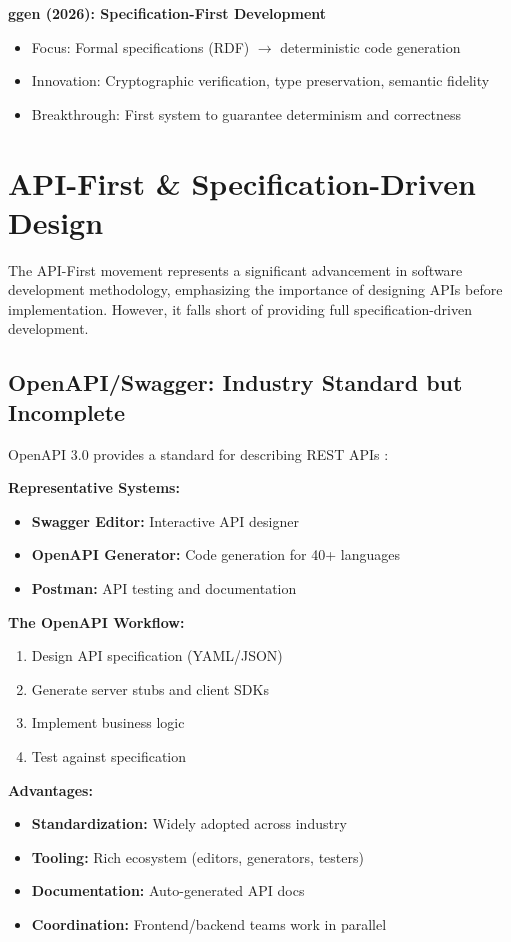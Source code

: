 \textbf{ggen (2026): Specification-First Development}
\begin{itemize}
    \item Focus: Formal specifications (RDF) $\rightarrow$ deterministic code generation
    \item Innovation: Cryptographic verification, type preservation, semantic fidelity
    \item Breakthrough: First system to guarantee determinism and correctness
\end{itemize}

\section{API-First \& Specification-Driven Design}

The API-First movement represents a significant advancement in software development methodology, emphasizing the importance of designing APIs before implementation. However, it falls short of providing full specification-driven development.

\subsection{OpenAPI/Swagger: Industry Standard but Incomplete}

OpenAPI 3.0 provides a standard for describing REST APIs \cite{openapi2020}:

\textbf{Representative Systems:}
\begin{itemize}
    \item \textbf{Swagger Editor:} Interactive API designer
    \item \textbf{OpenAPI Generator:} Code generation for 40+ languages
    \item \textbf{Postman:} API testing and documentation
\end{itemize}

\textbf{The OpenAPI Workflow:}
\begin{enumerate}
    \item Design API specification (YAML/JSON)
    \item Generate server stubs and client SDKs
    \item Implement business logic
    \item Test against specification
\end{enumerate}

\textbf{Advantages:}
\begin{itemize}
    \item \textbf{Standardization:} Widely adopted across industry
    \item \textbf{Tooling:} Rich ecosystem (editors, generators, testers)
    \item \textbf{Documentation:} Auto-generated API docs
    \item \textbf{Coordination:} Frontend/backend teams work in parallel
\end{itemize}

